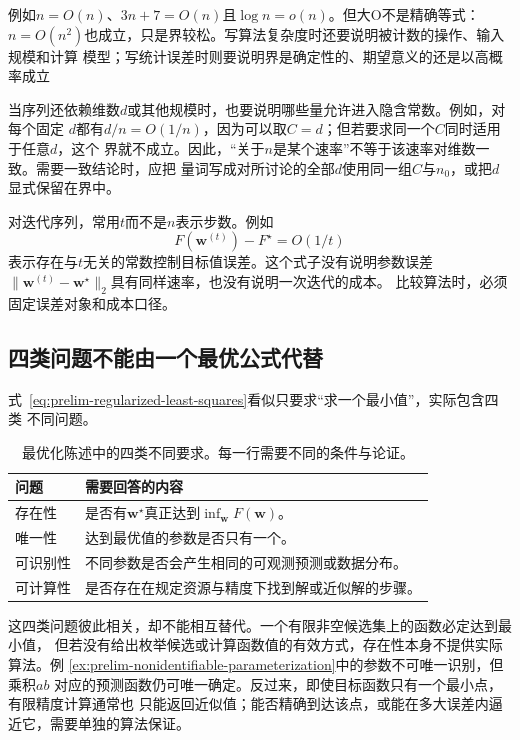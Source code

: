 例如$n=O(n)$、$3n+7=O(n)$且$\log n=o(n)$。但大O不是精确等式：
$n=O(n^2)$也成立，只是界较松。写算法复杂度时还要说明被计数的操作、输入规模和计算
模型；写统计误差时则要说明界是确定性的、期望意义的还是以高概率成立

当序列还依赖维数$d$或其他规模时，也要说明哪些量允许进入隐含常数。例如，对每个固定
$d$都有$d/n=O(1/n)$，因为可以取$C=d$；但若要求同一个$C$同时适用于任意$d$，这个
界就不成立。因此，“关于$n$是某个速率”不等于该速率对维数一致。需要一致结论时，应把
量词写成对所讨论的全部$d$使用同一组$C$与$n_0$，或把$d$显式保留在界中。

对迭代序列，常用$t$而不是$n$表示步数。例如
\[
  F(\bm{w}^{(t)})-F^\star=O(1/t)
\]
表示存在与$t$无关的常数控制目标值误差。这个式子没有说明参数误差
$\lVert\bm{w}^{(t)}-\bm{w}^\star\rVert_2$具有同样速率，也没有说明一次迭代的成本。
比较算法时，必须固定误差对象和成本口径。

\subsection{四类问题不能由一个最优公式代替}

式~\eqref{eq:prelim-regularized-least-squares}看似只要求“求一个最小值”，实际包含四类
不同问题。

\begin{table}[htbp]
  \centering
  \small
  \begin{tabularx}{\linewidth}{@{}lX@{}}
    \toprule
    \textbf{问题} & \textbf{需要回答的内容} \\
    \midrule
    存在性 & 是否有$\bm{w}^\star$真正达到$\inf_{\bm{w}}F(\bm{w})$。 \\
    唯一性 & 达到最优值的参数是否只有一个。 \\
    可识别性 & 不同参数是否会产生相同的可观测预测或数据分布。 \\
    可计算性 & 是否存在在规定资源与精度下找到解或近似解的步骤。 \\
    \bottomrule
  \end{tabularx}
  \caption{最优化陈述中的四类不同要求。每一行需要不同的条件与论证。}
  \label{tab:prelim-four-solution-questions}
\end{table}

这四类问题彼此相关，却不能相互替代。一个有限非空候选集上的函数必定达到最小值，
但若没有给出枚举候选或计算函数值的有效方式，存在性本身不提供实际算法。例
\ref{ex:prelim-nonidentifiable-parameterization}中的参数不可唯一识别，但乘积$ab$
对应的预测函数仍可唯一确定。反过来，即使目标函数只有一个最小点，有限精度计算通常也
只能返回近似值；能否精确到达该点，或能在多大误差内逼近它，需要单独的算法保证。

